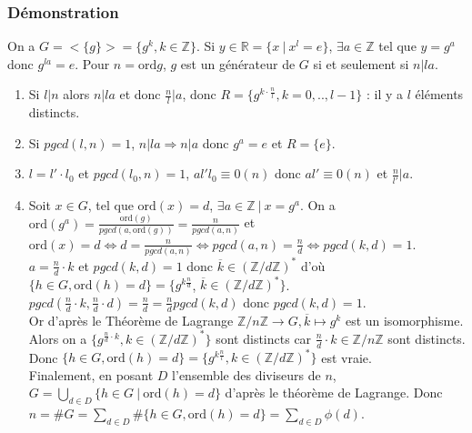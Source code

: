\documentclass[a4paper,10pt]{book} %
\newcommand{\R}{\mathbb{R}}
\newcommand{\Z}{\mathbb{Z}}
\newcommand{\tq}{~|~}
\newcommand{\ord}{\mathrm{ord}}
\begin{document}
\subsubsection{Démonstration} 
On a $G=<\{g\}>= \{g^k , k\in \Z \}$. Si $y \in \R = \{ x\tq x^l = e\}$, $\exists a \in \Z$ tel que $y = g^a$ donc $g^{la} =e$. Pour $n = \ord{g}$, $g$ est un générateur de $G$ si et seulement si $n|la$.\\

\begin{enumerate}
\item Si $l|n$ alors $n|la$ et donc $\frac{n}{l} | a$, donc $R=\{ g^{k\cdot \frac{n}{l}} ,k=0,..,l-1\}$ : il y a $l$ éléments distincts.\\
\item Si $pgcd(l,n) = 1$, $n|la \Rightarrow n|a$ donc $g^a=e$ et $R=\{e\}$.\\
\item $l = l'\cdot l_0$ et $pgcd(l_0,n)=1$, $al'l_0\equiv0(n)$ donc $al'\equiv0(n)$ et $\frac{n}{l'}|a$.\\
\item Soit $x\in G$, tel que $\ord(x)=d$, $\exists a\in \Z \tq x=g^a$. On a $\ord(g^a) = \frac{\ord(g)}{pgcd(a,\ord(g))} = \frac{n}{pgcd(a,n)}$ et $\ord(x) = d \Leftrightarrow d = \frac{n}{pgcd(a,n)} \Leftrightarrow pgcd(a,n) =\frac{n}{d} \Leftrightarrow pgcd(k,d) =1$.\\

$a=\frac{n}{d}\cdot k$ et $pgcd(k,d)=1$ donc $\overline{k} \in (\Z/d\Z)^*$ d'où $\{ h\in G, \ord(h)=d\} = \{ g^{k\frac{n}{d}}$, $\overline{k} \in (\Z/d\Z)^*\}$. \\

$pgcd(\frac{n}{d}\cdot k,\frac{n}{d}\cdot d)=\frac{n}{d} = \frac{n}{d} pgcd(k,d)$ donc $pgcd(k,d)=1$.\\

Or d'après le Théorème de Lagrange $\Z/n\Z \rightarrow G , \overline{k} \mapsto g^k$ est un isomorphisme.\\

Alors on a $\{g^{\frac{n}{d}\cdot k}, k\in (\Z/d\Z)^*\}$ sont distincts car $\frac{n}{d}\cdot k \in \Z/n\Z$ sont distincts.\\

Donc  $\{h\in G, \ord(h) = d\} = \{g^{k\frac{n}{l}}, k\in (\Z/d\Z)^*\}$ est vraie.\\

Finalement, en posant $D$ l'ensemble des diviseurs de $n$, $G=\displaystyle\bigcup_{d\in D}\{h\in G \tq \ord(h)=d\}$ d'après le théorème de Lagrange.
Donc $n=\# G=\sum_{d\in D}\#\{h\in G, \ord(h)=d\}=\sum_{d\in D} \phi(d)$.
\end{enumerate}
\end{document}
